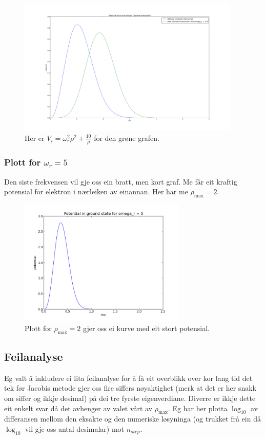 \documentclass[11pt, a4paper]{article}
\begin{document}
      \begin{figure}[H]
        \centering
        \includegraphics[width=400px]{omega1to10.png}
        \caption{Her er $V_i = \omega_r^2\rho^2 + \frac{10}{\rho}$ for den grøne grafen.}
      \end{figure}

    \subsubsection{Plott for $\omega_r = 5$}
      Den siste frekvensen vil gje oss ein bratt, men kort graf. Me får eit kraftig potensial for elektron i nærleiken av einannan. Her har me $\rho_{\text{max}} = 2$.
      \begin{figure}[H]
        \centering
        \includegraphics[width=300px]{omega5.png}
        \caption{Plott for $\rho_{\text{max}} = 2$ gjer oss ei kurve med eit stort potensial.}
      \end{figure}




  \subsection{Feilanalyse}
    Eg valt å inkludere ei lita feilanalyse for å få eit overblikk over kor lang tid det tek før Jacobis metode gjer oss fire siffers nøyaktighet (merk at det er her snakk om 
    siffer og ikkje desimal) på dei tre fyrste eigenverdiane. Diverre er ikkje dette eit enkelt svar då det avhenger av valet vårt av $\rho_{\text{max}}$. Eg har her 
    plotta $\log_{10}$ av differansen mellom den eksakte og den numeriske løsyninga (og trukket frå ein då $\log_{10}$ vil gje oss antal desimalar) mot $n_{step}$.
    
\end{document}
